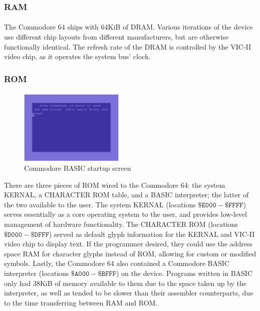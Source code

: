 \documentclass{article}
\begin{document}
\subsubsection{RAM}
\paragraph{}
The Commodore 64 ships with 64KiB of DRAM. Various iterations of the device use different chip layouts from different manufacturers, but are otherwise functionally identical. The refresh rate of the DRAM is controlled by the VIC-II video chip, as it operates the system bus' clock.

\subsubsection{ROM}
\paragraph{}
\begin{figure}
\begin{center}
\includegraphics[width=5cm]{c64_basic}
\end{center}
\caption{Commodore BASIC startup screen}
\end{figure}
There are three pieces of ROM wired to the Commodore 64: the system KERNAL, a CHARACTER ROM table, and a BASIC interpreter; the latter of the two available to the user. The system KERNAL (locations $\mathtt{\$E000 - \$FFFF}$) serves essentially as a core operating system to the user, and provides low-level management of hardware functionality. The CHARACTER ROM (locations $\mathtt{\$D000 - \$DFFF}$) served as default glyph information for the KERNAL and VIC-II video chip to display text. If the programmer desired, they could use the address space RAM for character glyphs instead of ROM, allowing for custom or modified symbols. Lastly, the Commodore 64 also contained a Commodore BASIC interpreter (locations $\mathtt{\$A000 - \$BFFF}$) on the device. Programs written in BASIC only had 38KiB of memory available to them due to the space taken up by the interpreter, as well as tended to be slower than their assembler counterparts, due to the time transferring between RAM and ROM.
\end{document}
